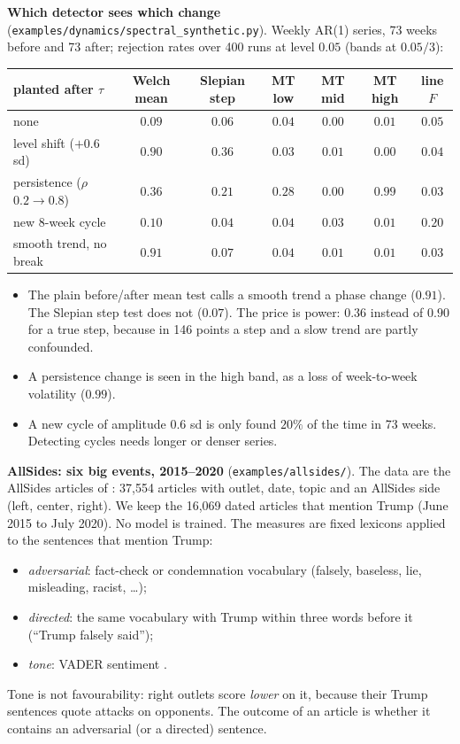 \documentclass[11pt]{article}
\theoremstyle{definition}
\theoremstyle{remark}
\begin{document}
\textbf{Which detector sees which change} (\texttt{examples/dynamics/spectral\_synthetic.py}). Weekly AR(1) series, 73 weeks before and 73 after; rejection rates over 400 runs at level $0.05$ (bands at $0.05/3$):
\begin{center}\small
\begin{tabular}{lcccccc}
\toprule
planted after $\tau$ & Welch mean & Slepian step & MT low & MT mid & MT high & line $F$\\
\midrule
none & $0.09$ & $0.06$ & $0.04$ & $0.00$ & $0.01$ & $0.05$\\
level shift ($+0.6$ sd) & $\mathbf{0.90}$ & $\mathbf{0.36}$ & $0.03$ & $0.01$ & $0.00$ & $0.04$\\
persistence ($\rho$ $0.2\to0.8$) & $0.36$ & $0.21$ & $0.28$ & $0.00$ & $\mathbf{0.99}$ & $0.03$\\
new 8-week cycle & $0.10$ & $0.04$ & $0.04$ & $0.03$ & $0.01$ & $\mathbf{0.20}$\\
smooth trend, no break & $0.91$ & $0.07$ & $0.04$ & $0.01$ & $0.01$ & $0.03$\\
\bottomrule
\end{tabular}
\end{center}
\begin{itemize}
  \item The plain before/after mean test calls a smooth trend a phase change ($0.91$). The Slepian step test does not ($0.07$). The price is power: $0.36$ instead of $0.90$ for a true step, because in 146 points a step and a slow trend are partly confounded.
  \item A persistence change is seen in the high band, as a loss of week-to-week volatility ($0.99$).
  \item A new cycle of amplitude $0.6$ sd is only found $20\%$ of the time in 73 weeks. Detecting cycles needs longer or denser series.
\end{itemize}

\textbf{AllSides: six big events, 2015--2020} (\texttt{examples/allsides/}). The data are the AllSides articles of \cite{baly}: 37{,}554 articles with outlet, date, topic and an AllSides side (left, center, right). We keep the 16{,}069 dated articles that mention Trump (June 2015 to July 2020). No model is trained. The measures are fixed lexicons applied to the sentences that mention Trump:
\begin{itemize}
  \item \emph{adversarial}: fact-check or condemnation vocabulary (falsely, baseless, lie, misleading, racist, \dots);
  \item \emph{directed}: the same vocabulary with Trump within three words before it (``Trump falsely said'');
  \item \emph{tone}: VADER sentiment \cite{vader}.
\end{itemize}
Tone is not favourability: right outlets score \emph{lower} on it, because their Trump sentences quote attacks on opponents. The outcome of an article is whether it contains an adversarial (or a directed) sentence.
\end{document}
